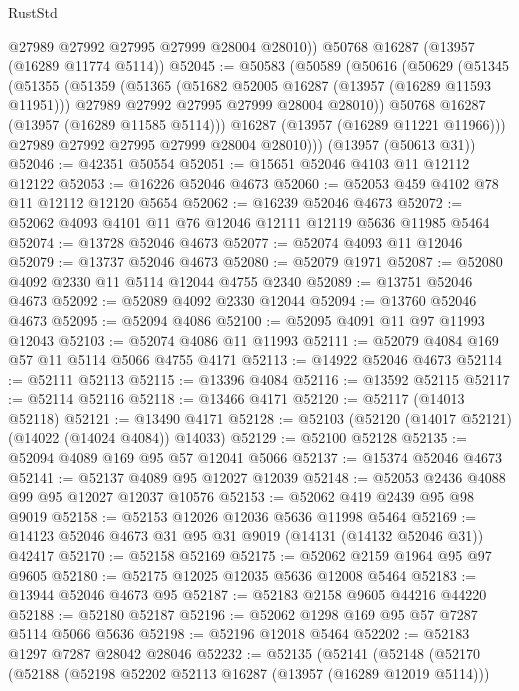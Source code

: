 \begin{lexlean}{RustStd}
\begin{coremodule}
        @27989
        @27992
        @27995
        @27999
        @28004
        @28010))
    @50768
    @16287
    (@13957 (@16289 @11774 @5114))
@52045 := @50583
    (@50589
      (@50616
        (@50629
          (@51345
            (@51355
              (@51359
                (@51365
                  (@51682 @52005 @16287 (@13957 (@16289 @11593 @11951)))
                  @27989
                  @27992
                  @27995
                  @27999
                  @28004
                  @28010))
              @50768
              @16287
              (@13957 (@16289 @11585 @5114)))
            @16287
            (@13957 (@16289 @11221 @11966)))
          @27989
          @27992
          @27995
          @27999
          @28004
          @28010)))
    (@13957 (@50613 @31))
@52046 := @42351 @50554
@52051 := @15651 @52046 @4103 @11 @12112 @12122
@52053 := @16226 @52046 @4673
@52060 := @52053 @459 @4102 @78 @11 @12112 @12120 @5654
@52062 := @16239 @52046 @4673
@52072 := @52062 @4093 @4101 @11 @76 @12046 @12111 @12119 @5636 @11985 @5464
@52074 := @13728 @52046 @4673
@52077 := @52074 @4093 @11 @12046
@52079 := @13737 @52046 @4673
@52080 := @52079 @1971
@52087 := @52080 @4092 @2330 @11 @5114 @12044 @4755 @2340
@52089 := @13751 @52046 @4673
@52092 := @52089 @4092 @2330 @12044
@52094 := @13760 @52046 @4673
@52095 := @52094 @4086
@52100 := @52095 @4091 @11 @97 @11993 @12043
@52103 := @52074 @4086 @11 @11993
@52111 := @52079 @4084 @169 @57 @11 @5114 @5066 @4755 @4171
@52113 := @14922 @52046 @4673
@52114 := @52111 @52113
@52115 := @13396 @4084
@52116 := @13592 @52115
@52117 := @52114 @52116
@52118 := @13466 @4171
@52120 := @52117 (@14013 @52118)
@52121 := @13490 @4171
@52128 := @52103 (@52120 (@14017 @52121) (@14022 (@14024 @4084)) @14033)
@52129 := @52100 @52128
@52135 := @52094 @4089 @169 @95 @57 @12041 @5066
@52137 := @15374 @52046 @4673
@52141 := @52137 @4089 @95 @12027 @12039
@52148 := @52053 @2436 @4088 @99 @95 @12027 @12037 @10576
@52153 := @52062 @419 @2439 @95 @98 @9019
@52158 := @52153 @12026 @12036 @5636 @11998 @5464
@52169 := @14123 @52046 @4673 @31 @95 @31 @9019 (@14131 (@14132 @52046 @31)) @42417
@52170 := @52158 @52169
@52175 := @52062 @2159 @1964 @95 @97 @9605
@52180 := @52175 @12025 @12035 @5636 @12008 @5464
@52183 := @13944 @52046 @4673 @95
@52187 := @52183 @2158 @9605 @44216 @44220
@52188 := @52180 @52187
@52196 := @52062 @1298 @169 @95 @57 @7287 @5114 @5066 @5636
@52198 := @52196 @12018 @5464
@52202 := @52183 @1297 @7287 @28042 @28046
@52232 := @52135
    (@52141
      (@52148
        (@52170
          (@52188
            (@52198 @52202 @52113 @16287 (@13957 (@16289 @12019 @5114)))

\end{coremodule}
\end{lexlean}
